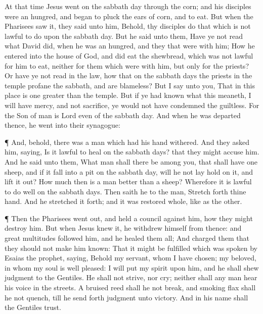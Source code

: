 At that time Jesus went on the sabbath day through the
corn; and his disciples were an hungred, and began to pluck the ears of
corn, and to eat.  But when the Pharisees saw it, they said
unto him, Behold, thy disciples do that which is not lawful to do upon
the sabbath day.  But he said unto them, Have ye not read
what David did, when he was an hungred, and they that were with him;
 How he entered into the house of God, and did eat the
shewbread, which was not lawful for him to eat, neither for them which
were with him, but only for the priests?  Or have ye not
read in the law, how that on the sabbath days the priests in the temple
profane the sabbath, and are blameless?  But I say unto you,
That in this place is one greater than the temple.  But if
ye had known what this meaneth, I will have mercy, and not sacrifice, ye
would not have condemned the guiltless.  For the Son of man
is Lord even of the sabbath day.  And when he was departed
thence, he went into their synagogue:

 ¶ And, behold, there was a man which had his hand
withered. And they asked him, saying, Is it lawful to heal on the
sabbath days? that they might accuse him.  And he said unto
them, What man shall there be among you, that shall have one sheep, and
if it fall into a pit on the sabbath day, will he not lay hold on it,
and lift it out?  How much then is a man better than a
sheep? Wherefore it is lawful to do well on the sabbath days.
 Then saith he to the man, Stretch forth thine hand. And he
stretched it forth; and it was restored whole, like as the other.

 ¶ Then the Pharisees went out, and held a council against
him, how they might destroy him.  But when Jesus knew it,
he withdrew himself from thence: and great multitudes followed him, and
he healed them all;  And charged them that they should not
make him known:  That it might be fulfilled which was
spoken by Esaias the prophet, saying,  Behold my servant,
whom I have chosen; my beloved, in whom my soul is well pleased: I will
put my spirit upon him, and he shall shew judgment to the Gentiles.
 He shall not strive, nor cry; neither shall any man hear
his voice in the streets.  A bruised reed shall he not
break, and smoking flax shall he not quench, till he send forth judgment
unto victory.  And in his name shall the Gentiles trust.

